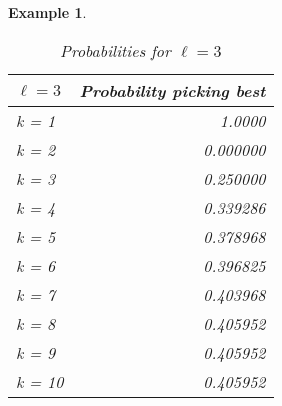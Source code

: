 \documentclass{article}
\newtheorem{example}{Example} %
\begin{document}
\begin{example}
\begin{table}[H]
\centering
\begin{minipage}{0.33\textwidth}
\small
\begin{tabular}{lr}
\hline
$\ell=3$ & Probability picking best  \\
\hline
k = 1  &     1.0000 \\
k = 2  &     0.000000 \\
k = 3  &     0.250000  \\
k = 4  &     0.339286 \\
k = 5  &     0.378968 \\
k = 6  &     0.396825  \\
k = 7  &     0.403968 \\
k = 8  &     0.405952   \\
k = 9  &     0.405952   \\
k = 10 &     0.405952   \\
\hline
\end{tabular}
\caption{Probabilities for $\ell=3$}
\end{minipage}\hfill
\end{table}

\begin{table}[H]
\centering
\begin{minipage}{0.33\textwidth}


\end{minipage}
\end{table}
\end{example}
\end{document}
